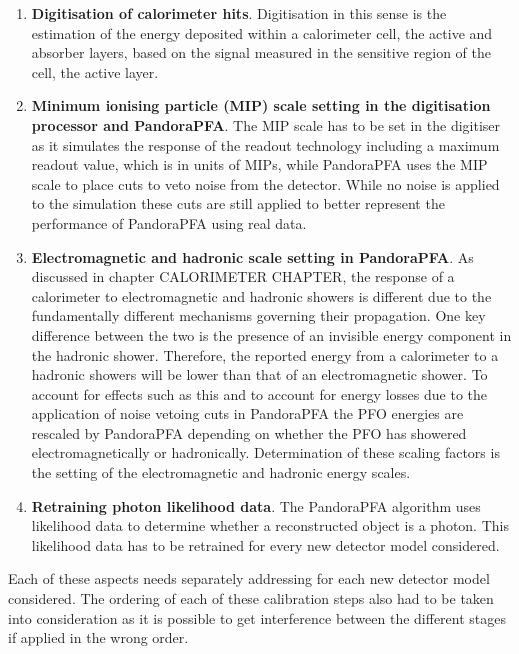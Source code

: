 \begin{enumerate}
\item \textbf{Digitisation of calorimeter hits}.  Digitisation in this sense is the estimation of the energy deposited within a calorimeter cell, the active and absorber layers, based on the signal measured in the sensitive region of the cell, the active layer.  
\item \textbf{Minimum ionising particle (MIP) scale setting in the digitisation processor and PandoraPFA}.  The MIP scale has to be set in the digitiser as it simulates the response of the readout technology including a maximum readout value, which is in units of MIPs, while PandoraPFA uses the MIP scale to place cuts to veto noise from the detector.  While no noise is applied to the simulation these cuts are still applied to better represent the performance of PandoraPFA using real data.  
\item \textbf{Electromagnetic and hadronic scale setting in PandoraPFA}.  As discussed in chapter CALORIMETER CHAPTER, the response of a calorimeter to electromagnetic and hadronic showers is different due to the fundamentally different mechanisms governing their propagation.  One key difference between the two is the presence of an invisible energy component in the hadronic shower.  Therefore, the reported energy from a calorimeter to a hadronic showers will be lower than that of an electromagnetic shower.  To account for effects such as this and to account for energy losses due to the application of noise vetoing cuts in PandoraPFA the PFO energies are rescaled by PandoraPFA depending on whether the PFO has showered electromagnetically or hadronically.  Determination of these scaling factors is the setting of the electromagnetic and hadronic energy scales.  
\item \textbf{Retraining photon likelihood data}.  The PandoraPFA algorithm uses likelihood data to determine whether a reconstructed object is a photon.  This likelihood data has to be retrained for every new detector model considered. 
\end{enumerate}

Each of these aspects needs separately addressing for each new detector model considered.  The ordering of each of these calibration steps also had to be taken into consideration as it is possible to get interference between the different stages if applied in the wrong order.  



